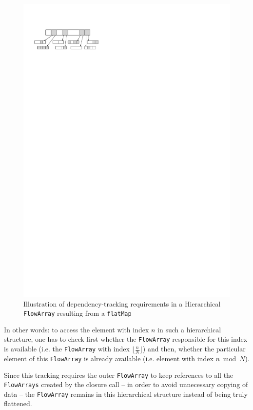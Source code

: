 \documentclass[runningheads,a4paper,fleqn]{llncs}
\begin{document}
\begin{figure}
  \centering
  \includegraphics{flatMap-dependency}
  \caption{Illustration of dependency-tracking requirements in a
    Hierarchical \texttt{FlowArray} resulting from a \texttt{flatMap}}
  \label{fig:flatMap-dependency}
\end{figure}


In other words: to access the element with index $n$ in
such a hierarchical structure, one has to check first whether the
\texttt{FlowArray} responsible for this index is available (i.e. the \texttt{FlowArray}
with index $\lfloor \frac nN \rfloor$) and then, whether
the particular element of this \texttt{FlowArray} is already available
(i.e. element with index $n \bmod N$).

Since this tracking requires the outer \texttt{FlowArray} to keep references to
all the \texttt{FlowArrays} created by the closure call -- in order to avoid
unnecessary copying of data -- the \texttt{FlowArray} remains in this
hierarchical structure instead of being truly flattened.
\end{document}
